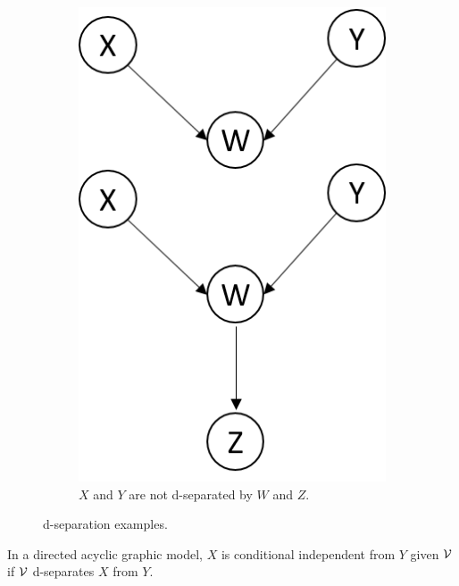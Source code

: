 \begin{refsection}
\begin{figure}[H]
\begin{subfigure}[b]{0.3\textwidth}
		\includegraphics[width=\textwidth]{../figures/statisticalModeling/d-separationSchemeVstructure}
		\caption{$X$ and $Y$ are not d-separated by $W$ and $Z$.}
	\end{subfigure}
	\caption{d-separation examples.}
	\label{ch:statistical-models:fig:d-SeparationExamples}
\end{figure}


\begin{theorem}
In a directed acyclic graphic model, $X$ is conditional independent from $Y$ given $\mathcal{V}$ if $\mathcal{V}$ d-separates $X$ from $Y$.	
\end{theorem}






\end{refsection}
